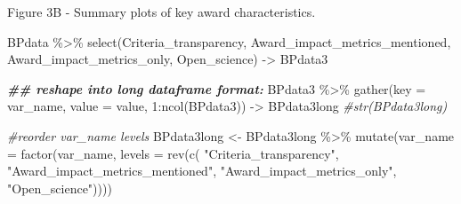 \documentclass[
]{article}
\newenvironment{Shaded}{\begin{snugshade}}{\end{snugshade}}
\newcommand{\AttributeTok}[1]{\textcolor[rgb]{0.77,0.63,0.00}{#1}}
\newcommand{\CommentTok}[1]{\textcolor[rgb]{0.56,0.35,0.01}{\textit{#1}}}
\newcommand{\DecValTok}[1]{\textcolor[rgb]{0.00,0.00,0.81}{#1}}
\newcommand{\DocumentationTok}[1]{\textcolor[rgb]{0.56,0.35,0.01}{\textbf{\textit{#1}}}}
\newcommand{\FunctionTok}[1]{\textcolor[rgb]{0.00,0.00,0.00}{#1}}
\newcommand{\NormalTok}[1]{#1}
\newcommand{\OtherTok}[1]{\textcolor[rgb]{0.56,0.35,0.01}{#1}}
\newcommand{\SpecialCharTok}[1]{\textcolor[rgb]{0.00,0.00,0.00}{#1}}
\newcommand{\StringTok}[1]{\textcolor[rgb]{0.31,0.60,0.02}{#1}}
\begin{document}
Figure 3B - Summary plots of key award characteristics.

\begin{Shaded}
\begin{Highlighting}[]
\NormalTok{BPdata }\SpecialCharTok{\%\textgreater{}\%} \FunctionTok{select}\NormalTok{(Criteria\_transparency, Award\_impact\_metrics\_mentioned, Award\_impact\_metrics\_only, Open\_science) }\OtherTok{{-}\textgreater{}}\NormalTok{ BPdata3}

\DocumentationTok{\#\# reshape into long dataframe format:}
\NormalTok{BPdata3 }\SpecialCharTok{\%\textgreater{}\%} \FunctionTok{gather}\NormalTok{(}\AttributeTok{key =}\NormalTok{ var\_name, }\AttributeTok{value =}\NormalTok{ value, }\DecValTok{1}\SpecialCharTok{:}\FunctionTok{ncol}\NormalTok{(BPdata3)) }\OtherTok{{-}\textgreater{}}\NormalTok{ BPdata3long}
\CommentTok{\#str(BPdata3long)}

\CommentTok{\#reorder var\_name levels}
\NormalTok{BPdata3long }\OtherTok{\textless{}{-}}\NormalTok{ BPdata3long }\SpecialCharTok{\%\textgreater{}\%} \FunctionTok{mutate}\NormalTok{(}\AttributeTok{var\_name =} \FunctionTok{factor}\NormalTok{(var\_name, }\AttributeTok{levels =} \FunctionTok{rev}\NormalTok{(}\FunctionTok{c}\NormalTok{( }\StringTok{"Criteria\_transparency"}\NormalTok{, }
                                                                            \StringTok{"Award\_impact\_metrics\_mentioned"}\NormalTok{, }
                                                                            \StringTok{"Award\_impact\_metrics\_only"}\NormalTok{, }
                                                                            \StringTok{"Open\_science"}\NormalTok{))))}


\end{Highlighting}
\end{Shaded}
\end{document}
